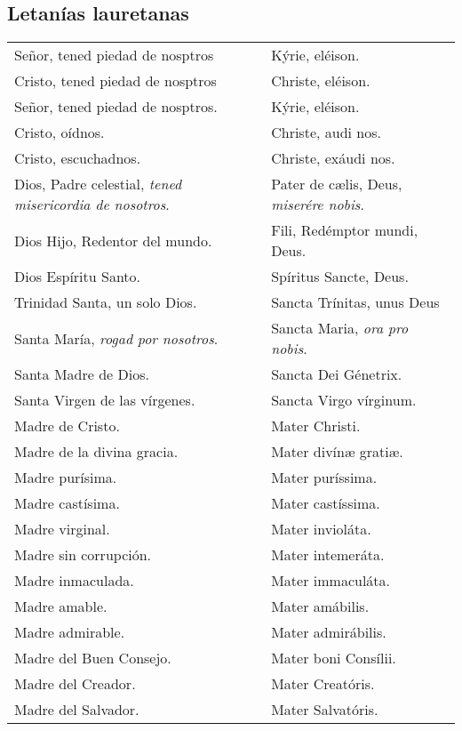 \documentclass[11pt,a4paper]{book}
\begin{document}
    \subsection*{Letanías lauretanas}
    \begin{longtable} { p{} p{} }
        Señor, tened piedad de nosptros & Kýrie, eléison.\\
        Cristo, tened piedad de nosptros & Christe, eléison.\\
        Señor, tened piedad de nosptros. & Kýrie, eléison.\\
        Cristo, oídnos. & Christe, audi nos.\\
        Cristo, escuchadnos. & Christe, exáudi nos.\\
        Dios, Padre celestial, \emph{tened misericordia de nosotros}. & Pater de cælis, Deus, \emph{miserére nobis}.\\
        Dios Hijo, Redentor del mundo. & Fili, Redémptor mundi, Deus.\\
        Dios Espíritu Santo. & Spíritus Sancte, Deus.\\
        Trinidad Santa, un solo Dios. & Sancta Trínitas, unus Deus\\
        Santa María, \emph{rogad por nosotros}. & Sancta Maria, \emph{ora pro nobis}.\\
        Santa Madre de Dios. & Sancta Dei Génetrix.\\
        Santa Virgen de las vírgenes. & Sancta Virgo vírginum.\\
        Madre de Cristo. & Mater Christi.\\
        Madre de la divina gracia. & Mater divínæ gratiæ.\\
        Madre purísima. & Mater puríssima.\\
        Madre castísima. & Mater castíssima.\\
        Madre virginal. & Mater invioláta.\\
        Madre sin corrupción. & Mater intemeráta.\\
        Madre inmaculada. & Mater immaculáta.\\
        Madre amable. & Mater amábilis.\\
        Madre admirable. & Mater admirábilis.\\
        Madre del Buen Consejo. & Mater boni Consílii.\\
        Madre del Creador. & Mater Creatóris.\\
        Madre del Salvador. & Mater Salvatóris.\\

\end{longtable}
\end{document}
